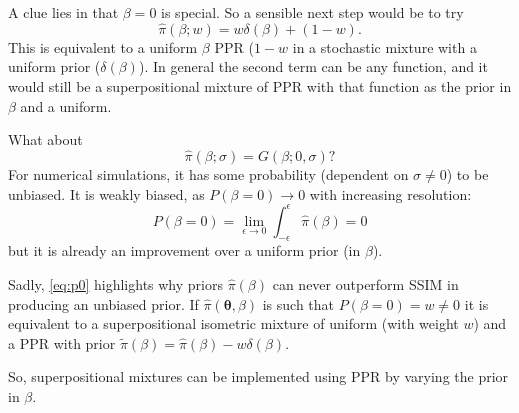\documentclass[usenatbib]{mnras}
\begin{document}
A clue lies in that $\beta=0$ is special. So a sensible next step
would be to try
\begin{equation}
  \label{}
\hat{\pi}(\beta; w) = w \delta(\beta) + (1-w). 
\end{equation}
This is equivalent to a uniform $\beta$ PPR (\(1-w\) in a stochastic
mixture with a uniform prior ($\delta(\beta)$). In general the second
term can be any function, and it would still be a superpositional
mixture of PPR with that function as the prior in $\beta$ and a
uniform.

What about
\begin{equation}
\hat{\pi}(\beta; \sigma) = G(\beta; 0, \sigma)?
\end{equation}
For numerical simulations, it has some probability (dependent on
$\sigma \ne 0$) to be unbiased. It is weakly biased, as
\(P(\beta=0) \rightarrow 0\) with increasing resolution:
\begin{equation}
  \label{eq:p0}
   P(\beta=0) = \lim_{\epsilon\rightarrow 0} \int_{-\epsilon}^{\epsilon}\hat{\pi}(\beta) = 0
\end{equation}
but it is already an improvement over a uniform prior (in $\beta$).

Sadly, \cref{eq:p0} highlights why priors $\hat{\pi}(\beta)$ can never
outperform SSIM in producing an unbiased prior. If
$\hat{\pi}(\bm{\theta}, \beta)$ is such that \(P(\beta=0) = w \ne 0\)
it is equivalent to a superpositional isometric mixture of uniform
(with weight \(w\)) and a PPR with prior
$\tilde{\pi}(\beta) = \hat{\pi}(\beta) - w \delta(\beta)$.

So, superpositional mixtures can be implemented using PPR by varying
the prior in $\beta$.
\end{document}
